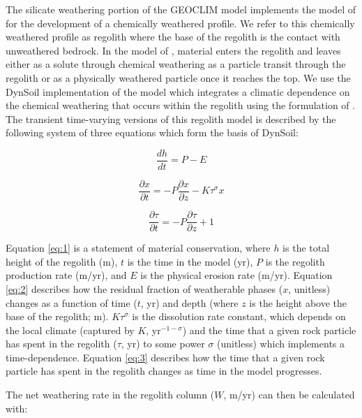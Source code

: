 \documentclass[11pt,letterpaper]{article}
\begin{document}
The silicate weathering portion of the GEOCLIM model implements the model of \cite{Gabet2009a} for the development of a chemically weathered profile. We refer to this chemically weathered profile as regolith where the base of the regolith is the contact with unweathered bedrock. In the model of \citet{Gabet2009a}, material enters the regolith and leaves either as a solute through chemical weathering as a particle transit through the regolith or as a physically weathered particle once it reaches the top. We use the DynSoil implementation of the \cite{Gabet2009a} model which integrates a climatic dependence on the chemical weathering that occurs within the regolith using the formulation of \cite{West2012a}. The transient time-varying versions of this regolith model is described by the following system of three equations which form the basis of DynSoil:

\begin{equation}
    \frac{dh}{dt} = P - E
    \label{eq:1}
\end{equation}

\begin{equation}
    \frac{\partial x}{\partial t} = -P \frac{\partial x}{\partial z} - K \tau^{\sigma}x
    \label{eq:2}
\end{equation}

\begin{equation}
    \frac{\partial \tau}{\partial t} = -P \frac{\partial \tau}{\partial z} + 1
    \label{eq:3}
\end{equation}

\noindent
Equation \ref{eq:1} is a statement of material conservation, where $h$ is the total height of the regolith (m), $t$ is the time in the model (yr), $P$ is the regolith production rate (m/yr), and $E$ is the physical erosion rate (m/yr). Equation \ref{eq:2} describes how the residual fraction of weatherable phases ($x$, unitless) changes as a function of time ($t$, yr) and depth (where $z$ is the height above the base of the regolith; m). $K \tau^{\sigma}$ is the dissolution rate constant, which depends on the local climate (captured by $K$, yr$^{-1-\sigma}$) and the time that a given rock particle has spent in the regolith ($\tau$, yr) to some power $\sigma$ (unitless) which implements a time-dependence. Equation \ref{eq:3} describes how the time that a given rock particle has spent in the regolith changes as time in the model progresses.

The net weathering rate in the regolith column ($W$, m/yr) can then be calculated with:
\end{document}
